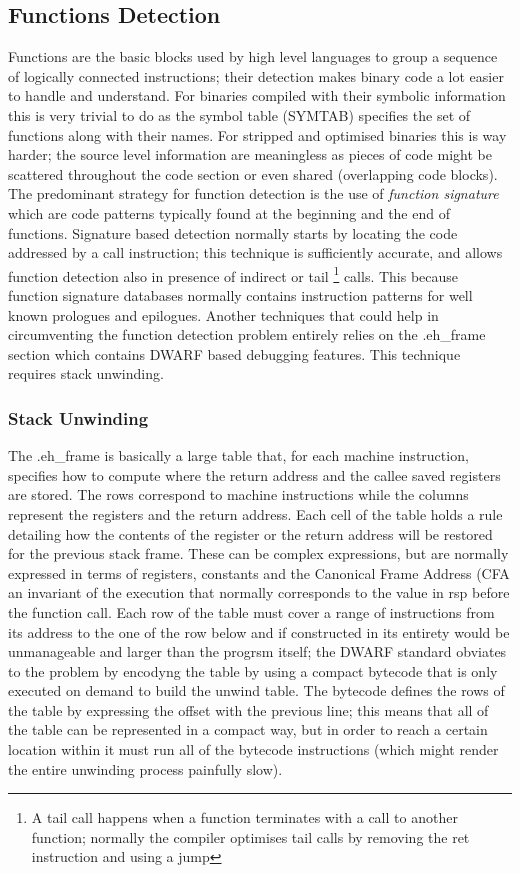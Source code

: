 \subsection{Functions Detection}
Functions are the basic blocks used by high level languages to group a sequence of logically connected instructions;
their detection makes binary code a lot easier to handle and understand. For binaries compiled with their symbolic
information this is very trivial to do as the symbol table ({\ttfamily SYMTAB}) specifies the set of functions along
with their names. For stripped and optimised binaries this is way harder; the source level information are meaningless
as pieces of code might be scattered throughout the code section or even shared (overlapping code blocks). The
predominant strategy for function detection is the use of \textit{function signature} which are code patterns typically
found at the beginning and the end of functions. Signature based detection normally starts by locating the code
addressed by a {\ttfamily call} instruction; this technique is sufficiently accurate, and allows function detection also
in presence of indirect or tail \footnote{A tail call happens when a function terminates with a call to another
function; normally the compiler optimises tail calls by removing the ret instruction and using a jump} calls. This
because function signature databases normally contains instruction patterns for well known prologues and epilogues.
Another techniques that could help in circumventing the function detection problem entirely relies on the
{\ttfamily .eh\_frame} section which contains DWARF based debugging features. This technique requires stack unwinding.

\subsubsection{Stack Unwinding}
The {\ttfamily .eh\_frame} is basically a large table that, for each machine instruction, specifies how to compute where
the return address and the callee saved registers are stored. The rows correspond to machine instructions while the
columns represent the registers and the return address. Each cell of the table holds a rule detailing how the contents
of the register or the return address will be restored for the previous stack frame. These can be complex expressions,
but are normally expressed in terms of registers, constants and the Canonical Frame Address ({\ttfamily CFA} an
invariant of the execution that normally corresponds to the value in {\ttfamily rsp} before the function call. Each row
of the table must cover a range of instructions from its address to the one of the row below and if constructed in its
entirety would be unmanageable and larger than the progrsm itself; the DWARF standard obviates to the problem by
encodyng the table by using a compact bytecode that is only executed on demand to build the unwind table. The bytecode
defines the rows of the table by expressing the offset with the previous line; this means that all of the table can be
represented in a compact way, but in order to reach a certain location within it must run all of the bytecode
instructions (which might render the entire unwinding process painfully slow).


